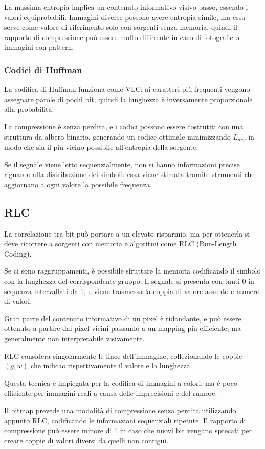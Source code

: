 La massima entropia implica un contenuto informativo visivo basso, essendo i valori equiprobabili. Immagini diverse possono avere entropia simile, ma essa serve come valore di riferimento solo con sorgenti senza memoria, quindi il rapporto di compressione può essere molto differente in caso di fotografie o immagini con pattern.

\subsubsection{Codici di Huffman}
La codifica di Huffman funziona come VLC: ai caratteri più frequenti vengono assegnate parole di pochi bit, quindi la lunghezza è inversamente proporzionale alla probabilità.

La compressione è senza perdita, e i codici possono essere costrutiti con una struttura da albero binario, generando un codice ottimale minimizzando $L_{avg}$ in modo che sia il più vicino possibile all'entropia della sorgente.

Se il segnale viene letto sequenzialmente, non si hanno informazioni precise riguardo alla distribuzione dei simboli: essa viene stimata tramite strumenti che aggiornano a ogni valore la possibile frequenza.

\subsection{RLC}
La correlazione tra bit può portare a un elevato risparmio, ma per ottenerla si deve ricorrere a sorgenti con memoria e algoritmi come RLC  (Run-Length Coding). 

Se ci sono raggruppamenti, è possibile sfruttare la memoria codificando il simbolo con la lunghezza del corrispondente gruppo. Il segnale si presenta con tanti 0 in sequenza intervallati da 1, e viene trasmessa la coppia di valore assunto e numero di valori. 

Gran parte del contenuto informativo di un pixel è ridondante, e può essere ottenuto a partire dai pixel vicini passando a un mapping più efficiente, ma generalmente non interpretabile visivamente. 

RLC considera singolarmente le linee dell'immagine, collezionando le coppie $(g, w)$ che indicao rispettivamente il valore e la lunghezza.

Questa tecnica è impiegata per la codifica di immagini a colori, ma è poco efficiente per immagini reali a causa delle imprecisioni e del rumore. 

Il bitmap prevede una modalità di compressione senza perdita utilizzando appunto RLC, codificando le informazioni sequenziali ripetute. Il rapporto di compressione può essere minore di 1 in caso che nuovi bit vengano sprecati per creare coppie di valori diversi da quelli non contigui.

